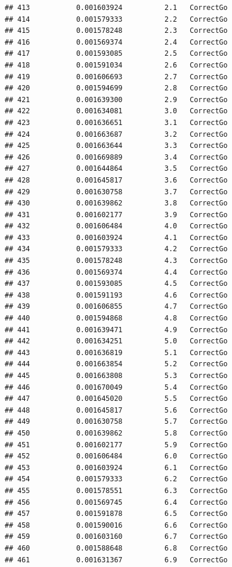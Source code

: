 \documentclass[
]{article}
\begin{document}
\begin{verbatim}
## 413           0.001603924          2.1   CorrectGo
## 414           0.001579333          2.2   CorrectGo
## 415           0.001578248          2.3   CorrectGo
## 416           0.001569374          2.4   CorrectGo
## 417           0.001593085          2.5   CorrectGo
## 418           0.001591034          2.6   CorrectGo
## 419           0.001606693          2.7   CorrectGo
## 420           0.001594699          2.8   CorrectGo
## 421           0.001639300          2.9   CorrectGo
## 422           0.001634081          3.0   CorrectGo
## 423           0.001636651          3.1   CorrectGo
## 424           0.001663687          3.2   CorrectGo
## 425           0.001663644          3.3   CorrectGo
## 426           0.001669889          3.4   CorrectGo
## 427           0.001644864          3.5   CorrectGo
## 428           0.001645817          3.6   CorrectGo
## 429           0.001630758          3.7   CorrectGo
## 430           0.001639862          3.8   CorrectGo
## 431           0.001602177          3.9   CorrectGo
## 432           0.001606484          4.0   CorrectGo
## 433           0.001603924          4.1   CorrectGo
## 434           0.001579333          4.2   CorrectGo
## 435           0.001578248          4.3   CorrectGo
## 436           0.001569374          4.4   CorrectGo
## 437           0.001593085          4.5   CorrectGo
## 438           0.001591193          4.6   CorrectGo
## 439           0.001606855          4.7   CorrectGo
## 440           0.001594868          4.8   CorrectGo
## 441           0.001639471          4.9   CorrectGo
## 442           0.001634251          5.0   CorrectGo
## 443           0.001636819          5.1   CorrectGo
## 444           0.001663854          5.2   CorrectGo
## 445           0.001663808          5.3   CorrectGo
## 446           0.001670049          5.4   CorrectGo
## 447           0.001645020          5.5   CorrectGo
## 448           0.001645817          5.6   CorrectGo
## 449           0.001630758          5.7   CorrectGo
## 450           0.001639862          5.8   CorrectGo
## 451           0.001602177          5.9   CorrectGo
## 452           0.001606484          6.0   CorrectGo
## 453           0.001603924          6.1   CorrectGo
## 454           0.001579333          6.2   CorrectGo
## 455           0.001578551          6.3   CorrectGo
## 456           0.001569745          6.4   CorrectGo
## 457           0.001591878          6.5   CorrectGo
## 458           0.001590016          6.6   CorrectGo
## 459           0.001603160          6.7   CorrectGo
## 460           0.001588648          6.8   CorrectGo
## 461           0.001631367          6.9   CorrectGo

\end{verbatim}
\end{document}
